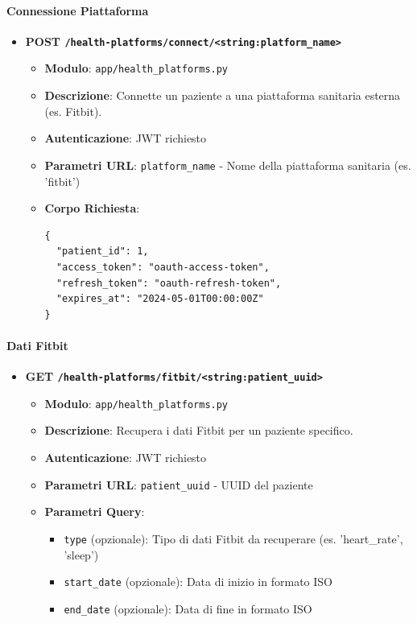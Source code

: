 \documentclass[12pt,a4paper,oneside]{report}
\begin{document}
\paragraph{Connessione Piattaforma}
\begin{itemize}
    \item \textbf{POST \texttt{/health-platforms/connect/<string:platform\_name>}}
          \begin{itemize}
              \item \textbf{Modulo}: \texttt{app/health\_platforms.py}
              \item \textbf{Descrizione}: Connette un paziente a una piattaforma sanitaria esterna (es. Fitbit).
              \item \textbf{Autenticazione}: JWT richiesto
              \item \textbf{Parametri URL}: \texttt{platform\_name} - Nome della piattaforma sanitaria (es. 'fitbit')
              \item \textbf{Corpo Richiesta}:
                    \begin{verbatim}
{
  "patient_id": 1,
  "access_token": "oauth-access-token",
  "refresh_token": "oauth-refresh-token",
  "expires_at": "2024-05-01T00:00:00Z"
}
        \end{verbatim}
          \end{itemize}
\end{itemize}

\paragraph{Dati Fitbit}
\begin{itemize}
    \item \textbf{GET \texttt{/health-platforms/fitbit/<string:patient\_uuid>}}
          \begin{itemize}
              \item \textbf{Modulo}: \texttt{app/health\_platforms.py}
              \item \textbf{Descrizione}: Recupera i dati Fitbit per un paziente specifico.
              \item \textbf{Autenticazione}: JWT richiesto
              \item \textbf{Parametri URL}: \texttt{patient\_uuid} - UUID del paziente
              \item \textbf{Parametri Query}:
                    \begin{itemize}
                        \item \texttt{type} (opzionale): Tipo di dati Fitbit da recuperare (es. 'heart\_rate', 'sleep')
                        \item \texttt{start\_date} (opzionale): Data di inizio in formato ISO
                        \item \texttt{end\_date} (opzionale): Data di fine in formato ISO
                    \end{itemize}
          \end{itemize}
\end{itemize}
\end{document}

